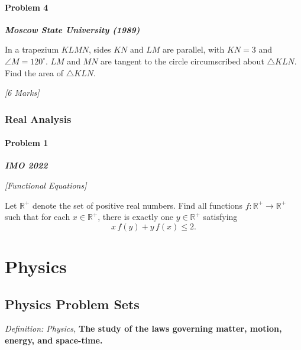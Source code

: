 \documentclass[openany,oneside,12pt,hidelinks]{book}
\newcommand{\problemmeta}[1]{%
  \begin{cataloguebox}\textbf{\emph{#1}}\end{cataloguebox}%
}
\begin{document}

\subsection{Problem 4}

\problemmeta{Moscow State University (1989)}

In a trapezium \(KLMN\), sides \(KN\) and \(LM\) are parallel, with \(KN=3\) and
\(\angle M = 120^{\circ}\). \(LM\) and \(MN\) are tangent to the circle
circumscribed about \(\triangle KLN\). Find the area of \(\triangle KLN\).

\hfill\textit{[6 Marks]}

\newpage

\section{Real Analysis}

\subsection{Problem 1}

\problemmeta{IMO 2022}\hfill\textit{[Functional Equations]}

Let \(\mathbb{R}^{+}\) denote the set of positive real numbers. Find all
functions \(f : \mathbb{R}^{+} \to \mathbb{R}^{+}\) such that for each
\(x \in \mathbb{R}^{+}\), there is exactly one \(y \in \mathbb{R}^{+}\) satisfying
\[
  x\,f(y) + y\,f(x) \le 2.
\]

\part{Physics}

\chapter{Physics Problem Sets}
\emph{Definition: Physics,}
\textbf{The study of the laws governing matter, motion, energy, and space-time.}

\newpage

\end{document}
